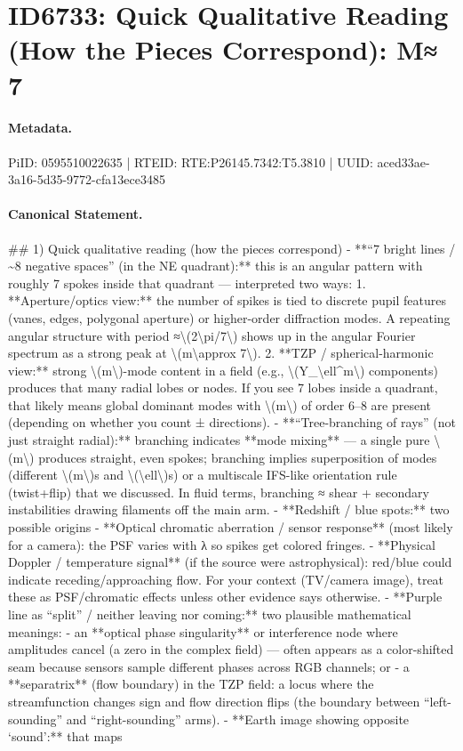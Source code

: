 \section*{ID6733: Quick Qualitative Reading (How the Pieces Correspond): M≈ 7}
\paragraph{Metadata.}
PiID: 0595510022635 | RTEID: RTE:P26145.7342:T5.3810 | UUID: aced33ae-3a16-5d35-9772-cfa13ece3485

\paragraph{Canonical Statement.}
\#\# 1) Quick qualitative reading (how the pieces correspond) - **“7 bright lines / \textasciitilde{}8 negative spaces” (in the NE quadrant):** this is an angular pattern with roughly 7 spokes inside that quadrant — interpreted two ways: 1. **Aperture/optics view:** the number of spikes is tied to discrete pupil features (vanes, edges, polygonal aperture) or higher-order diffraction modes. A repeating angular structure with period ≈\textbackslash{}(2\textbackslash{}pi/7\textbackslash{}) shows up in the angular Fourier spectrum as a strong peak at \textbackslash{}(m\textbackslash{}approx 7\textbackslash{}). 2. **TZP / spherical-harmonic view:** strong \textbackslash{}(m\textbackslash{})-mode content in a field (e.g., \textbackslash{}(Y\_\textbackslash{}ell\textasciicircum{}m\textbackslash{}) components) produces that many radial lobes or nodes. If you see 7 lobes inside a quadrant, that likely means global dominant modes with \textbackslash{}(m\textbackslash{}) of order 6–8 are present (depending on whether you count ± directions). - **“Tree-branching of rays” (not just straight radial):** branching indicates **mode mixing** — a single pure \textbackslash{}(m\textbackslash{}) produces straight, even spokes; branching implies superposition of modes (different \textbackslash{}(m\textbackslash{})s and \textbackslash{}(\textbackslash{}ell\textbackslash{})s) or a multiscale IFS-like orientation rule (twist+flip) that we discussed. In fluid terms, branching ≈ shear + secondary instabilities drawing filaments off the main arm. - **Redshift / blue spots:** two possible origins - **Optical chromatic aberration / sensor response** (most likely for a camera): the PSF varies with λ so spikes get colored fringes. - **Physical Doppler / temperature signal** (if the source were astrophysical): red/blue could indicate receding/approaching flow. For your context (TV/camera image), treat these as PSF/chromatic effects unless other evidence says otherwise. - **Purple line as “split” / neither leaving nor coming:** two plausible mathematical meanings: - an **optical phase singularity** or interference node where amplitudes cancel (a zero in the complex field) — often appears as a color-shifted seam because sensors sample different phases across RGB channels; or - a **separatrix** (flow boundary) in the TZP field: a locus where the streamfunction changes sign and flow direction flips (the boundary between “left-sounding” and “right-sounding” arms). - **Earth image showing opposite ‘sound’:** that maps 